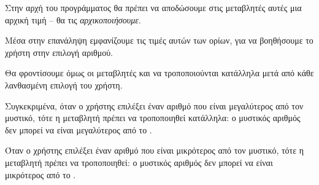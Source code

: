 \documentclass[a4paper,11pt,oneside]{book}
\begin{document}
Στην αρχή του προγράμματος θα πρέπει να αποδώσουμε στις μεταβλητές αυτές μια αρχική τιμή -- θα τις \emph{αρχικοποιήσουμε}. 


Μέσα στην επανάληψη εμφανίζουμε τις τιμές αυτών των ορίων, για να βοηθήσουμε το χρήστη στην επιλογή αριθμού. 


Θα φροντίσουμε όμως οι μεταβλητές  και  να τροποποιούνται κατάλληλα μετά από κάθε λανθασμένη επιλογή του χρήστη. 

Συγκεκριμένα, όταν ο χρήστης επιλέξει έναν αριθμό  που είναι μεγαλύτερος από τον μυστικό, τότε η μεταβλητή  πρέπει να τροποποιηθεί κατάλληλα: ο μυστικός αριθμός δεν μπορεί να είναι μεγαλύτερος από το . 


Όταν ο χρήστης επιλέξει έναν αριθμό  που είναι μικρότερος από τον μυστικό, τότε η μεταβλητή  πρέπει να τροποποιηθεί: ο μυστικός αριθμός δεν μπορεί να είναι μικρότερος από το .
\end{document}
